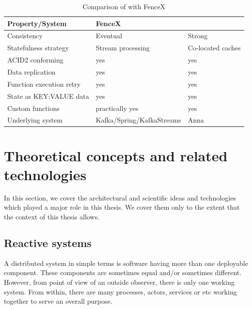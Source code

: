 \documentclass[a4]{report}
\begin{document}
    \begin{table}[h!]
        \begin{tabular}{ |l|l|l| }
            \hline
            Property/System          & FenceX                    & \cite{Functions-as-a-Service-2020} \\
            \hline
            Consistency              & Eventual                  & Strong                             \\
            Statefulness strategy    & Stream processing         & Co-located caches                  \\
            ACID2 conforming         & yes                       & yes                                \\
            Data replication         & yes                       & yes                                \\
            Function execution retry & yes                       & yes                                \\
            State as KEY:VALUE data  & yes                       & yes                                \\
            Custom functions         & practically yes           & yes                                \\
            Underlying system        & Kafka/Spring/KafkaStreams & Anna                               \\
            \hline
        \end{tabular}
        \caption{Comparison of  \cite{Functions-as-a-Service-2020} with FenceX}
        \label{table:fencex-comp}
    \end{table}


    \chapter{Theoretical concepts and related technologies}
    In this section, we cover the architectural and scientific ideas and technologies which played a major role in
    this thesis.
    We cover them only to the extent that the context of this thesis allows.


    \section{Reactive systems}
    A distributed system in simple terms is software having more than one deployable component.
    These components are sometimes equal and/or sometimes different.
    However, from point of view of an outside observer, there is only one working system.
    From within, there are many processes, actors, services or etc working together to serve an overall purpose.
\end{document}
